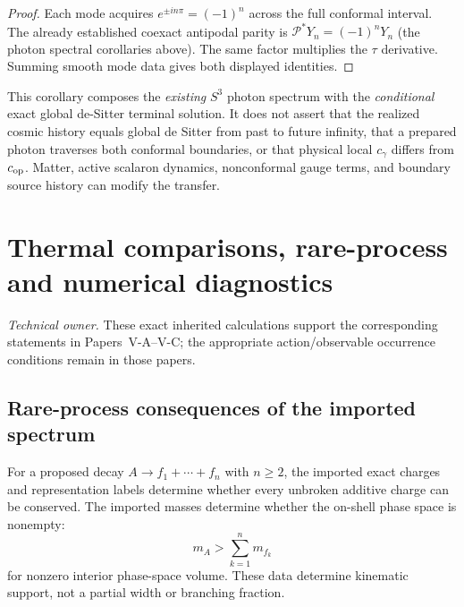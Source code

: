 \documentclass[11pt,a4paper]{article}
\begin{document}
\begin{proof}
Each mode acquires $e^{\pm in\pi}=(-1)^n$ across the full conformal
interval.  The already established coexact antipodal parity is
$\mathcal P^*Y_n=(-1)^nY_n$ (the photon spectral corollaries above).
The same factor multiplies the $\tau$ derivative.  Summing smooth mode
data gives both displayed identities.
\end{proof}
\begin{remark}
This corollary composes the \emph{existing} $S^3$ photon spectrum with
the \emph{conditional} exact global de-Sitter terminal solution.  It does
not assert that the realized cosmic history equals global de Sitter from
past to future infinity, that a prepared photon traverses both conformal
boundaries, or that physical local $c_\gamma$ differs from $c_{\rm op}$.
Matter, active scalaron dynamics, nonconformal gauge terms, and boundary
source history can modify the transfer.
\end{remark}



\setlength{\emergencystretch}{2em}

\section{Thermal comparisons, rare-process and numerical diagnostics}
\label{p5d:sec:G}
\noindent\textit{Technical owner.} These exact inherited calculations
support the corresponding statements in Papers~V-A--V-C;
the appropriate action/observable occurrence conditions remain in those papers.
\subsection{Rare-process consequences of the imported spectrum}
\label{p7v2:sec:rare-processes}

\begin{theorem}
\label{p7v2:thm:decay-support}
For a proposed decay \(A\to f_1+\cdots+f_n\) with \(n\geq2\), the imported exact charges and
representation labels determine whether every unbroken additive charge can be
conserved.  The imported masses determine whether the on-shell phase space is
nonempty:
\begin{equation}
\label{p7v2:eq:decay-support}
 m_A>\sum_{k=1}^{n}m_{f_k}
\end{equation}
for nonzero interior phase-space volume.  These data determine kinematic
support, not a partial width or branching fraction.
\end{theorem}
\end{document}
